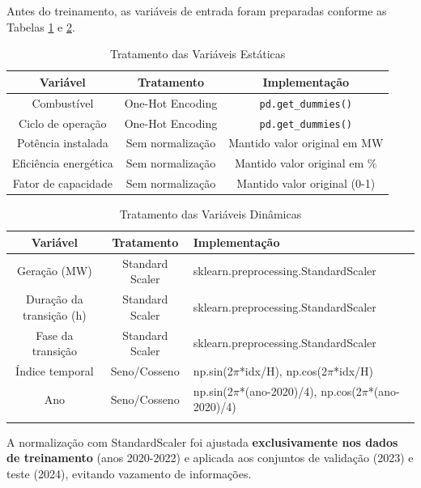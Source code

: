 Antes do treinamento, as variáveis de entrada foram preparadas conforme as Tabelas \ref{tab:variaveis_estaticas} e \ref{tab:variaveis_dinamicas}.

\begin{table}[H]
    \centering
    \renewcommand{\arraystretch}{1.5}
    \begin{tabular}{|c|c|c|}
        \hline
        \textbf{Variável} & \textbf{Tratamento} & \textbf{Implementação} \\
        \hline
        Combustível & One-Hot Encoding & \texttt{pd.get\_dummies()} \\
        Ciclo de operação & One-Hot Encoding & \texttt{pd.get\_dummies()} \\
        Potência instalada & Sem normalização & Mantido valor original em MW \\
        Eficiência energética & Sem normalização & Mantido valor original em \% \\
        Fator de capacidade & Sem normalização & Mantido valor original (0-1) \\
        \hline
    \end{tabular}
    \caption{Tratamento das Variáveis Estáticas}
    \label{tab:variaveis_estaticas}
\end{table}

\begin{table}[H]
    \centering
    \renewcommand{\arraystretch}{1.5}
    \begin{tabularx}{\textwidth}{|c|c|X|}
        \hline
        \textbf{Variável} & \textbf{Tratamento} & \textbf{Implementação} \\
        \hline
        Geração (MW) & Standard Scaler & sklearn.preprocessing.StandardScaler \\
        Duração da transição (h) & Standard Scaler & sklearn.preprocessing.StandardScaler \\
        Fase da transição & Standard Scaler & sklearn.preprocessing.StandardScaler \\
        Índice temporal & Seno/Cosseno & np.sin(2$\pi$*idx/H), np.cos(2$\pi$*idx/H) \\
        Ano & Seno/Cosseno & np.sin(2$\pi$*(ano-2020)/4), np.cos(2$\pi$*(ano-2020)/4) \\
        \hline
        \caption{Tratamento das Variáveis Dinâmicas}\label{tab:variaveis_dinamicas}
    \end{tabularx}
\end{table}

A normalização com StandardScaler foi ajustada \textbf{exclusivamente nos dados de treinamento} (anos 2020-2022) e aplicada aos conjuntos de validação (2023) e teste (2024), evitando vazamento de informações.

